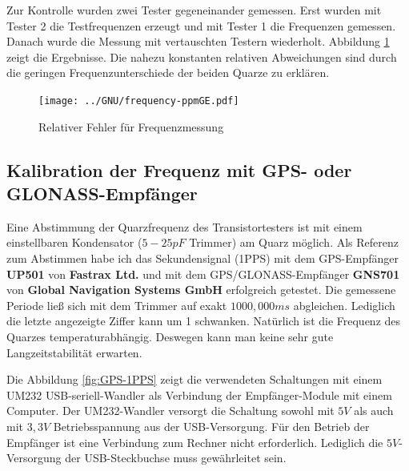 Zur Kontrolle wurden zwei Tester gegeneinander gemessen.
Erst wurden mit Tester 2 die Testfrequenzen erzeugt und mit Tester 1 die Frequenzen gemessen.
Danach wurde die Messung mit vertauschten Testern wiederholt.
Abbildung \ref{fig:freq-ppm} zeigt die Ergebnisse.
Die nahezu konstanten relativen Abweichungen sind durch die geringen Frequenzunterschiede der beiden Quarze zu erklären.

\begin{figure}[H]
\centering
\texttt{[image: ../GNU/frequency-ppmGE.pdf]}
\caption{Relativer Fehler für Frequenzmessung }
\label{fig:freq-ppm}
\end{figure}

\subsection{Kalibration der Frequenz mit GPS- oder GLONASS-Empfänger}

Eine Abstimmung der Quarzfrequenz des Transistortesters ist mit einem einstellbaren Kondensator (\(5-25pF\) Trimmer) am Quarz möglich.
Als Referenz zum Abstimmen habe ich das Sekundensignal (1PPS) mit dem GPS-Empfänger {\bf UP501} von {\bf Fastrax Ltd.} und
mit dem GPS/GLONASS-Empfänger {\bf GNS701} von {\bf Global Navigation Systems GmbH} erfolgreich getestet.
Die gemessene Periode ließ sich mit dem Trimmer auf exakt \(1000,000ms\) abgleichen.
Lediglich die letzte angezeigte Ziffer kann um 1 schwanken.
Natürlich ist die Frequenz des Quarzes temperaturabhängig.
Deswegen kann man keine sehr gute Langzeitstabilität erwarten.

Die Abbildung \ref{fig:GPS-1PPS} zeigt die verwendeten Schaltungen mit einem
UM232 USB-seriell-Wandler als Verbindung der Empfänger-Module mit einem Computer.
Der UM232-Wandler versorgt die Schaltung sowohl mit \(5V\) als auch mit \(3,3V\) Betriebsspannung
aus der USB-Versorgung.
Für den Betrieb der Empfänger ist eine Verbindung zum Rechner nicht erforderlich.
Lediglich die \(5V\)-Versorgung der USB-Steckbuchse muss gewährleitet sein.

